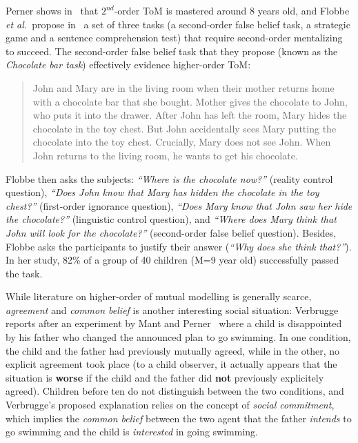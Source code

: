\documentclass{sig-alternate}
\newcommand{\etal}{{\textit{et al.~}}}
\begin{document}
Perner shows in~\cite{perner1988higher} that $2^{nd}$-order ToM is
mastered around 8 years old, and Flobbe \etal propose
in~\cite{flobbe2008children} a set of three tasks (a second-order false belief
task, a strategic game and a sentence comprehension test) that require
second-order mentalizing to succeed. The second-order false belief task that
they propose (known as the \emph{Chocolate bar task}) effectively evidence
higher-order ToM: \begin{quote} John and Mary are in the living room when their
mother returns home with a chocolate bar that she bought. Mother gives the
chocolate to John, who puts it into the drawer. After John has left the
room, Mary hides the chocolate in the toy chest. But John accidentally sees
Mary putting the chocolate into the toy chest. Crucially, Mary does not see
John. When John returns to the living room, he wants to get his chocolate.
\end{quote}

Flobbe then asks the subjects: \emph{``Where is the chocolate now?''} (reality
control question), \emph{``Does John know that Mary has hidden the chocolate in
the toy chest?''} (first-order ignorance question), \emph{``Does Mary know that
John saw her hide the chocolate?''} (linguistic control question), and
\emph{``Where does Mary think that John will look for the chocolate?''}
(second-order false belief question). Besides, Flobbe asks the participants to
justify their answer (\emph{``Why does she think that?''}). In her study, 82\%
of a group of 40 children (M=9 year old) successfully passed the task.

While literature on higher-order of mutual modelling is generally scarce, \emph{agreement}
and \emph{common belief} is another interesting social situation:
Verbrugge~\cite[p.~664]{verbrugge2009logic} reports after an experiment by Mant
and Perner~\cite{mant1988child} where a child is disappointed by his father who
changed the announced plan to go swimming. In one condition, the child and the
father had previously mutually agreed, while in the other, no explicit agreement
took place (to a child observer, it actually appears that the situation is
\textbf{worse} if the child and the father did \textbf{not} previously
explicitely agreed). Children before ten do not
distinguish between the two conditions, and Verbrugge's proposed explanation
relies on the concept of \emph{social commitment}, which implies
the \emph{common belief} between the two agent that the father \emph{intends} to
go swimming and the child is \emph{interested} in going swimming.
\end{document}
